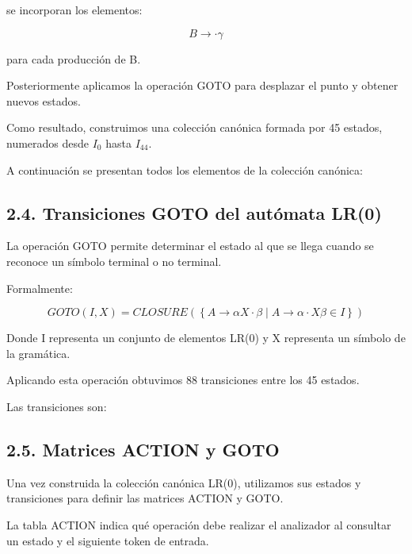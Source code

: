 \documentclass[11pt,letterpaper]{article}
\begin{document}
se incorporan los elementos:

\[
B \rightarrow \cdot \gamma
\]

para cada producción de B.

Posteriormente aplicamos la operación GOTO para
desplazar el punto y obtener nuevos estados.

Como resultado, construimos una colección canónica
formada por 45 estados, numerados desde
$I_0$ hasta $I_{44}$.

A continuación se presentan todos los elementos
de la colección canónica:



\subsection*{2.4. Transiciones GOTO del autómata LR(0)}

La operación GOTO permite determinar el estado
al que se llega cuando se reconoce un símbolo
terminal o no terminal.

Formalmente:

\[
GOTO(I,X)=
CLOSURE\left(
\left\{
A\rightarrow\alpha X\cdot\beta
\mid
A\rightarrow\alpha\cdot X\beta\in I
\right\}
\right)
\]

Donde I representa un conjunto de elementos LR(0)
y X representa un símbolo de la gramática.

Aplicando esta operación obtuvimos 88 transiciones
entre los 45 estados.

Las transiciones son:



\subsection*{2.5. Matrices ACTION y GOTO}

Una vez construida la colección canónica LR(0),
utilizamos sus estados y transiciones para
definir las matrices ACTION y GOTO.

La tabla ACTION indica qué operación debe realizar
el analizador al consultar un estado y el siguiente
token de entrada.
\end{document}
